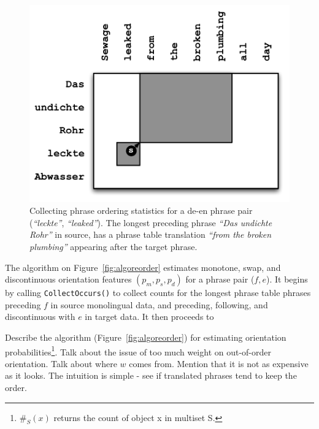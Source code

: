 \documentclass[11pt]{article}
\newcommand{\figref}[1]{Figure~\ref{#1}}
\newcommand{\emq}[1]{\emph{``#1''}}
\begin{document}
\begin{figure}[t]
\begin{center}
\centerline{\includegraphics[width=\columnwidth]{../figures/monoreord/monoreord.pdf}}
\caption{Collecting phrase ordering statistics for a de-en phrase pair (\emq{leckte}, \emq{leaked}).  The longest preceding phrase \emq{Das undichte Rohr} in source, has a phrase table translation \emq{from the broken plumbing} appearing after the target phrase.}
\label{fig:monoreord}
\end{center}
\vskip -0.2in
\end{figure}

The algorithm on \figref{fig:algoreorder} estimates monotone, swap, and discontinuous orientation features $(p_m, p_s, p_d)$ for a phrase pair ($f, e$).  It begins by calling {\tt \small CollectOccurs()} to collect counts for the longest phrase table phrases preceding $f$ in source monolingual data, and preceding, following, and discontinuous with $e$ in target data.  It then proceeds to 


Describe the algorithm (\figref{fig:algoreorder}) for estimating orientation probabilities\footnote{$\#_{S}(x)$ returns the count of object x in multiset S.}.  Talk about the issue of too much weight on out-of-order orientation.  Talk about where $w$ comes from.  Mention that it is not as expensive as it looks.  The intuition is simple - see if translated phrases tend to keep the order.

\end{document}
